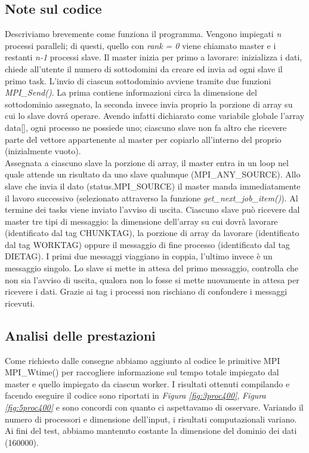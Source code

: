 \subsection*{Note sul codice}
Descriviamo brevemente come funziona il programma. Vengono impiegati \emph{n} processi paralleli; di questi, quello con \emph{rank = 0} viene chiamato master e i restanti \emph{n-1} processi slave.
Il master inizia per primo a lavorare: inizializza i dati, chiede all'utente il numero di sottodomini da creare ed invia ad ogni slave il primo task.
L'invio di ciascun sottodominio avviene tramite due funzioni \emph{MPI\_Send()}. La prima contiene informazioni circa la dimensione del sottodominio assegnato, la seconda invece invia proprio la porzione di array su cui lo slave dovr\'a operare. Avendo infatti dichiarato come variabile globale l'array data[], ogni processo ne possiede uno; ciascuno slave non fa altro che ricevere parte del vettore appartenente al master per copiarlo all'interno del proprio (inizialmente vuoto).\\
Assegnata a ciascuno slave la porzione di array, il master entra in un loop nel quale attende un risultato da uno slave qualunque (MPI\_ANY\_SOURCE). Allo slave che invia il dato (status.MPI\_SOURCE) il master manda immediatamente il lavoro successivo (selezionato attraverso la funzione \emph{get\_next\_job\_item()}). Al termine dei tasks viene inviato l'avviso di uscita.
Ciascuno slave pu\`o ricevere dal master tre tipi di messaggio: la dimensione dell'array su cui dovr\`a lavorare (identificato dal tag CHUNKTAG), la porzione di array da lavorare (identificato dal tag WORKTAG) oppure il messaggio di fine processo (identificato dal tag DIETAG). I primi due messaggi viaggiano in coppia, l'ultimo invece \`e un messaggio singolo. Lo slave si mette in attesa del primo messaggio, controlla che non sia l'avviso di uscita, qualora non lo fosse si mette nuovamente in attesa per ricevere i dati. Grazie ai tag i processi non rischiano di confondere i messaggi ricevuti.

\subsection*{Analisi delle prestazioni}
Come richiesto dalle consegne abbiamo aggiunto al codice le primitive MPI MPI\_Wtime() per raccogliere informazione sul tempo totale impiegato dal master e quello impiegato da ciascun worker.
I risultati ottenuti compilando e facendo eseguire il codice sono riportati in \emph{Figura \ref{fig:3proc400}}, \emph{Figura \ref{fig:5proc400}} e sono concordi con quanto ci aspettavamo di osservare. 
Variando il numero di processori e dimensione dell'input, i risultati computazionali variano. Ai fini del test, abbiamo mantenuto costante la dimensione del dominio dei dati (160000).


